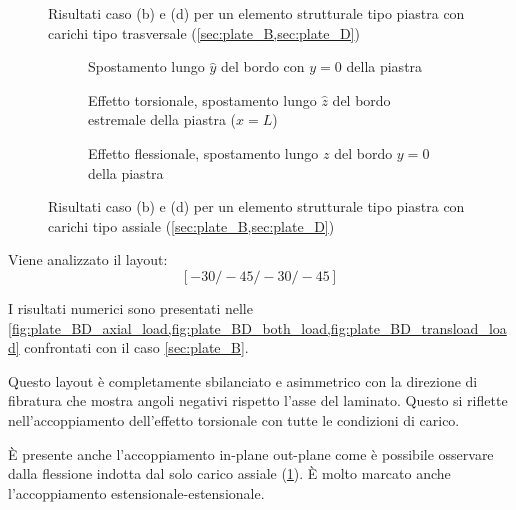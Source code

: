 \documentclass[a4paper,num-refs]{oup-contemporary}
\begin{document}
\begin{figure}[bt!]
\begin{subfigure}[t]{0.3\textwidth}
	\end{subfigure}
	\hfill
	\caption{Risultati caso (b) e (d) per un elemento strutturale tipo piastra con carichi tipo trasversale (\cref{sec:plate_B,sec:plate_D})}
	\label{fig:plate_BD_transload_load}

	\centering
	
	\begin{subfigure}[t]{0.3\textwidth}
		\centering
		\caption{Spostamento lungo $\hat y$ del bordo con $y=0$ della piastra}
		
	\end{subfigure}
	\hfill
	\begin{subfigure}[t]{0.3\textwidth}
		\centering
		
		\caption{Effetto torsionale, spostamento lungo $\hat z$ del bordo estremale della piastra ($x=L$)}
		
	\end{subfigure}
	\hfill
	\begin{subfigure}[t]{0.3\textwidth}
		\centering
		\caption{Effetto flessionale, spostamento lungo $z$ del bordo $y=0$ della piastra}
		\label{fig:plate_BD_extra}
	\end{subfigure}
	\hfill
	\caption{Risultati caso (b) e (d) per un elemento strutturale tipo piastra con carichi tipo assiale (\cref{sec:plate_B,sec:plate_D})}
	\label{fig:plate_BD_axial_load}
\end{figure}

Viene analizzato il layout:
\begin{equation}
\left[-30 /-45 /-30 /-45\right]
\end{equation}

I risultati numerici sono presentati nelle \cref{fig:plate_BD_axial_load,fig:plate_BD_both_load,fig:plate_BD_transload_load} confrontati con il caso \cref{sec:plate_B}.  

Questo layout è completamente sbilanciato e asimmetrico con la direzione di fibratura che mostra angoli negativi rispetto l'asse del laminato. Questo si riflette nell'accoppiamento dell'effetto torsionale con tutte le condizioni di carico. 

È presente anche l'accoppiamento in-plane out-plane come è possibile osservare dalla flessione indotta dal solo carico assiale (\cref{fig:plate_BD_extra}).  È molto marcato anche l'accoppiamento estensionale-estensionale. 
\end{document}
